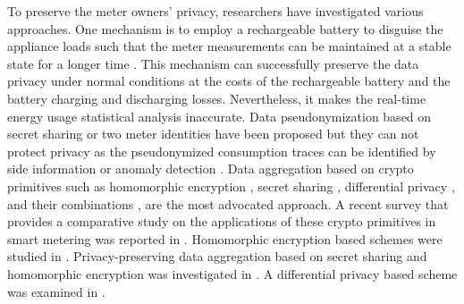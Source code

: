 \documentclass[letterpaper,12pt]{article}
\begin{document}
To preserve the meter owners' privacy, researchers have investigated various approaches. One mechanism is to employ a rechargeable battery to disguise the appliance loads such that the meter measurements can be maintained at a stable state for a longer time \cite{ge2013preserving,kalogridis2010privacy,varodayan2011smart}. This mechanism can successfully preserve the data privacy under normal conditions at the costs of the rechargeable battery and the battery charging and discharging losses. Nevertheless, it makes the real-time energy usage statistical analysis inaccurate.  Data pseudonymization based on secret sharing \cite{Rottondi2012greencom} or two meter identities \cite{Efthymiou2010smartgridcomm} have been proposed but they can not protect privacy as the pseudonymized consumption traces can be identified by side information or anomaly detection  \cite{Jawurek2011acsac}.  Data aggregation based on crypto primitives such as homomorphic encryption \cite{paillier1999public}, secret sharing \cite{shamir1979share,hu2012verifiable}, differential privacy \cite{danezis2011differentially}, and their combinations \cite{garcia2011privacy, rottondi2013distributed}, are the most advocated approach.  A recent survey that provides a comparative study on the applications of these crypto primitives in smart metering was reported in \cite{erkin2013privacy}. Homomorphic encryption based schemes were studied in \cite{paulet2014privacy,li2010secure,erkin2012private}. Privacy-preserving data aggregation based on secret sharing and homomorphic encryption was investigated in \cite{garcia2011privacy}.  A differential privacy based scheme was examined in \cite{acs2011have}.  %
\end{document}
